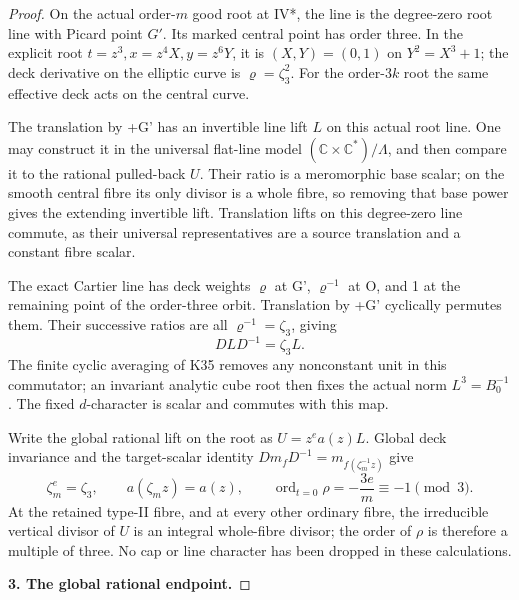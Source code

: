 \begin{proof}
On the actual order-\(m\) good root at IV*, the line is the degree-zero
root line with Picard point \(G'\). Its marked central point has order
three. In the explicit root \(t=z^3,x=z^4X,y=z^6Y\), it is
\((X,Y)=(0,1)\) on \(Y^2=X^3+1\); the deck derivative on the
elliptic curve is \(\varrho=\zeta_3^2\). For the order-\(3k\)
root the same effective deck acts on the central curve.

The translation by +G' has an invertible line lift \(L\) on this actual
root line. One may construct it in the universal flat-line model
\((\mathbb C\times\mathbb C^*)/\Lambda\), and then compare it to
the rational pulled-back \(U\). Their ratio is a meromorphic base scalar;
on the smooth central fibre its only divisor is a whole fibre, so removing
that base power gives the extending invertible lift. Translation lifts on
this degree-zero line commute, as their universal representatives are a
source translation and a constant fibre scalar.

The exact Cartier line has deck weights \(\varrho\) at G',
\(\varrho^{-1}\) at O, and 1 at the remaining point of the order-three
orbit. Translation by +G' cyclically permutes them. Their successive ratios
are all \(\varrho^{-1}=\zeta_3\), giving
\[
 DLD^{-1}=\zeta_3 L.                                             \tag{P3K.37.6}
\]
The finite cyclic averaging of K35 removes any nonconstant unit in this
commutator; an invariant analytic cube root then fixes the actual norm
\(L^3=B_0^{-1}\). The fixed \(d\)-character is scalar and commutes
with this map.

Write the global rational lift on the root as
\(U=z^e a(z)L\). Global deck invariance and the target-scalar identity
\(D m_f D^{-1}=m_{f(\zeta_m^{-1}z)}\) give
\[
 \zeta_m^e=\zeta_3,\qquad a(\zeta_mz)=a(z),\qquad
 \operatorname{ord}_{t=0}\rho=-\frac{3e}{m}\equiv-1\pmod3.
                                                                    \tag{P3K.37.7}
\]
At the retained type-II fibre, and at every other ordinary fibre, the
irreducible vertical divisor of \(U\) is an integral whole-fibre divisor;
the order of \(\rho\) is therefore a multiple of three. No cap or line
character has been dropped in these calculations.

\par\medskip\noindent\textbf{3. The global rational endpoint.}\enspace


\end{proof}
